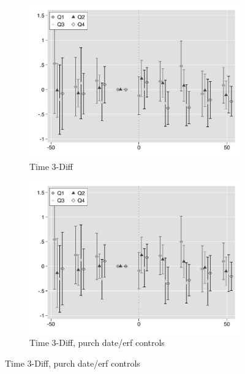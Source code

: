 \documentclass[12pt]{article}
\begin{document}
\begin{figure}
         \centering
   \caption[ Prices over time ]
    {\small Prices over time} 
 \begin{subfigure}[b]{0.48\textwidth}

                    \caption[Network2]%
            {{\footnotesize Time 3-Diff}}    
            \label{fig:prefor}
            \centering
            \includegraphics[width=\textwidth,trim={0.3cm .3cm 0.1cm 0cm}, clip=true]{figures/price_time_3d_no_ctrl_q}
        \end{subfigure}
        \hfill
        \begin{subfigure}[b]{0.48\textwidth}
                    \caption[Network2]%
            {{\footnotesize Time 3-Diff, purch date/erf controls}}    
            \label{fig:prefor}
            \centering
            \includegraphics[width=\textwidth,trim={0.3cm .3cm 0.1cm 0cm}, clip=true]{figures/price_time_3d_ctrl_q}

\end{subfigure}
\end{figure}
\end{document}
